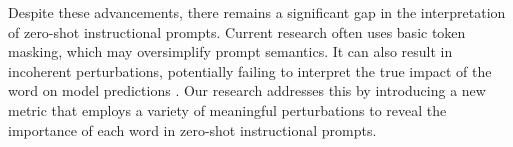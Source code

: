 Despite these advancements, there remains a significant gap in the interpretation of zero-shot instructional prompts. Current research often uses basic token masking, which may oversimplify prompt semantics. It can also result in incoherent perturbations, potentially failing to interpret the true impact of the word on model predictions \cite{yin2023did,feng-etal-2018-pathologies}. Our research addresses this by introducing a new metric that employs a variety of meaningful perturbations to reveal the importance of each word in zero-shot instructional prompts. 

